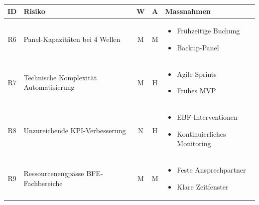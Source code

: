 \documentclass[11pt,a4paper]{article}
\begin{document}
\begin{longtable}{c p{4cm} c c p{4cm}}
\toprule
\textbf{ID} & \textbf{Risiko} & \textbf{W} & \textbf{A} & \textbf{Massnahmen}\\
\midrule
\endhead

\rowcolor{faorange!20}
R6 & Panel-Kapazitäten bei 4 Wellen & M & M &
    \begin{minipage}[t]{4cm}
    \vspace{0.1cm}
    \begin{itemize}[leftmargin=*, nosep, font=\small]
        \item Frühzeitige Buchung
        \item Backup-Panel
    \end{itemize}
    \vspace{0.1cm}
    \end{minipage}\\

\rowcolor{fared!20}
R7 & Technische Komplexität Automatisierung & M & H &
    \begin{minipage}[t]{4cm}
    \vspace{0.1cm}
    \begin{itemize}[leftmargin=*, nosep, font=\small]
        \item Agile Sprints
        \item Frühes MVP
    \end{itemize}
    \vspace{0.1cm}
    \end{minipage}\\

\rowcolor{fared!20}
R8 & Unzureichende KPI-Verbesserung & N & H &
    \begin{minipage}[t]{4cm}
    \vspace{0.1cm}
    \begin{itemize}[leftmargin=*, nosep, font=\small]
        \item EBF-Interventionen
        \item Kontinuierliches Monitoring
    \end{itemize}
    \vspace{0.1cm}
    \end{minipage}\\

\rowcolor{faorange!20}
R9 & Ressourcenengpässe BFE-Fachbereiche & M & M &
    \begin{minipage}[t]{4cm}
    \vspace{0.1cm}
    \begin{itemize}[leftmargin=*, nosep, font=\small]
        \item Feste Ansprechpartner
        \item Klare Zeitfenster
    \end{itemize}
    \vspace{0.1cm}
    \end{minipage}\\


\end{longtable}
\end{document}
